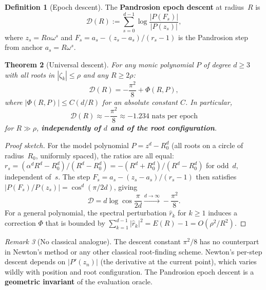 \documentclass[10pt,a4paper,oneside]{book}
\newtheorem{theorem}{Theorem}[chapter]
\theoremstyle{definition}
\newtheorem{definition}[theorem]{Definition}
\theoremstyle{remark}
\newtheorem{remark}[theorem]{Remark}
\begin{document}
\begin{definition}[Epoch descent]
\label{def:epoch_descent}
The \textbf{Pandrosion epoch descent} at radius~$R$ is
\begin{equation}
\label{eq:epoch_descent}
\boxed{\mathcal{D}(R) := \sum_{s=0}^{d-1}\log\frac{|P(F_s)|}{|P(z_s)|},}
\end{equation}
where $z_s = R\alpha\omega^s$ and $F_s = a_s - (z_s - a_s)/(r_s - 1)$ is the Pandrosion step from anchor $a_s = R\omega^s$.
\end{definition}

\begin{theorem}[Universal descent]
\label{thm:universal_descent}
For any monic polynomial $P$ of degree $d \geq 3$ with all roots in $|\zeta_k| \leq \rho$ and any $R \geq 2\rho$:
\begin{equation}
\label{eq:descent_value}
\mathcal{D}(R) = -\frac{\pi^2}{8} + \Phi(R, P),
\end{equation}
where $|\Phi(R, P)| \leq C(d/R)$ for an absolute constant $C$.  In particular,
\begin{equation}
\mathcal{D}(R) \approx -\frac{\pi^2}{8} \approx -1.234 \text{ nats per epoch}
\end{equation}
for $R \gg \rho$, \textbf{independently of $d$ and of the root configuration}.
\end{theorem}

\begin{proof}[Proof sketch]
For the model polynomial $P = z^d - R_0^d$ (all roots on a circle of radius~$R_0$, uniformly spaced), the ratios are all equal: $r_s = (\alpha^d R^d - R_0^d)/(R^d - R_0^d) = -(R^d + R_0^d)/(R^d - R_0^d)$ for odd~$d$, independent of~$s$.  The step $F_s = a_s - (z_s - a_s)/(r_s - 1)$ then satisfies $|P(F_s)/P(z_s)| = \cos^d(\pi/2d)$, giving
\[
\mathcal{D} = d\log\cos\frac{\pi}{2d} \xrightarrow{d \to \infty} -\frac{\pi^2}{8}.
\]
For a general polynomial, the spectral perturbation $\hat{r}_k$ for $k \geq 1$ induces a correction $\Phi$ that is bounded by $\sum_{k=1}^{d-1}|\hat{r}_k|^2 = E(R) - 1 = O(\rho^2/R^2)$.
\end{proof}

\begin{remark}[No classical analogue]
The descent constant $\pi^2/8$ has no counterpart in Newton's method or any other classical root-finding scheme.  Newton's per-step descent depends on $|P'(z_n)|$ (the derivative at the current point), which varies wildly with position and root configuration.  The Pandrosion epoch descent is a \textbf{geometric invariant} of the evaluation oracle.
\end{remark}
\end{document}
